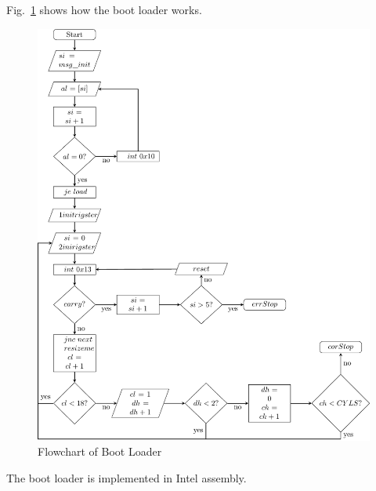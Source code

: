\documentclass{swfcthesisp}
\begin{document}
Fig.~\ref{fig:flowchart-of-boot-loader} shows how the boot loader works.
\begin{figure}[!ht]
  \centering
  \includegraphics[width=1\textwidth]{../figs/FlowchartTex/1/flowchartp.pdf}
  \caption{Flowchart of Boot Loader}
  \label{fig:flowchart-of-boot-loader}
\end{figure}

The boot loader is implemented in Intel assembly.
\end{document}
